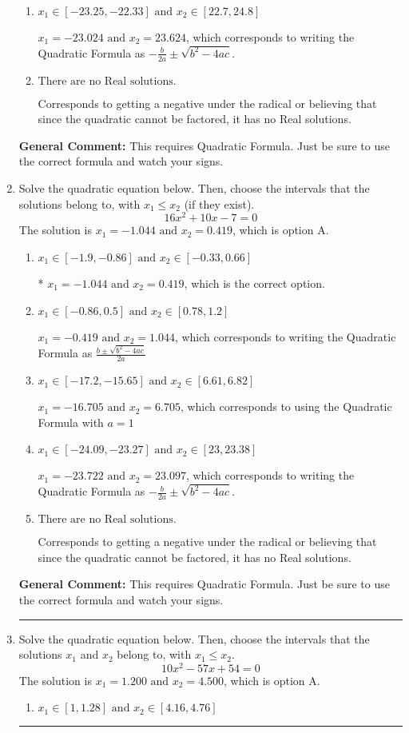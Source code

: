 \documentclass{extbook}[14pt]
\newcommand{\litem}[1]{\item #1

\rule{\textwidth}{0.4pt}}
\begin{document}
\begin{enumerate}
{\begin{enumerate}[label=\Alph*.]
* $x_1 = -0.283 \text{ and } x_2 = 0.883$, which is the correct option.
\item \( x_1 \in [-23.25, -22.33] \text{ and } x_2 \in [22.7, 24.8] \)

 $x_1 = -23.024 \text{ and } x_2 = 23.624$, which corresponds to writing the Quadratic Formula as $-\frac{b}{2a} \pm \sqrt{b^2 - 4ac}$.
\item \( \text{There are no Real solutions.} \)

Corresponds to getting a negative under the radical or believing that since the quadratic cannot be factored, it has no Real solutions.
\end{enumerate}

\textbf{General Comment:} This requires Quadratic Formula. Just be sure to use the correct formula and watch your signs.
}
\litem{
Solve the quadratic equation below. Then, choose the intervals that the solutions belong to, with $x_1 \leq x_2$ (if they exist).
\[ 16x^{2} +10 x -7 = 0 \]The solution is \( x_1 = -1.044 \text{ and } x_2 = 0.419 \), which is option A.\begin{enumerate}[label=\Alph*.]
\item \( x_1 \in [-1.9, -0.86] \text{ and } x_2 \in [-0.33, 0.66] \)

* $x_1 = -1.044 \text{ and } x_2 = 0.419$, which is the correct option.
\item \( x_1 \in [-0.86, 0.5] \text{ and } x_2 \in [0.78, 1.2] \)

 $x_1 = -0.419 \text{ and } x_2 = 1.044$, which corresponds to writing the Quadratic Formula as $\frac{b \pm \sqrt{b^2 - 4ac}}{2a}$
\item \( x_1 \in [-17.2, -15.65] \text{ and } x_2 \in [6.61, 6.82] \)

 $x_1 = -16.705 \text{ and } x_2 = 6.705$, which corresponds to using the Quadratic Formula with $a=1$
\item \( x_1 \in [-24.09, -23.27] \text{ and } x_2 \in [23, 23.38] \)

 $x_1 = -23.722 \text{ and } x_2 = 23.097$, which corresponds to writing the Quadratic Formula as $-\frac{b}{2a} \pm \sqrt{b^2 - 4ac}$.
\item \( \text{There are no Real solutions.} \)

Corresponds to getting a negative under the radical or believing that since the quadratic cannot be factored, it has no Real solutions.
\end{enumerate}

\textbf{General Comment:} This requires Quadratic Formula. Just be sure to use the correct formula and watch your signs.
}
\litem{
Solve the quadratic equation below. Then, choose the intervals that the solutions $x_1$ and $x_2$ belong to, with $x_1 \leq x_2$.
\[ 10x^{2} -57 x + 54 = 0 \]The solution is \( x_1 = 1.200 \text{ and } x_2 = 4.500 \), which is option A.\begin{enumerate}[label=\Alph*.]
\item \( x_1 \in [1, 1.28] \text{ and } x_2 \in [4.16, 4.76] \)


\end{enumerate}}
\end{enumerate}
\end{document}
